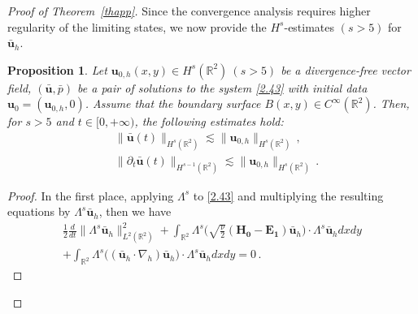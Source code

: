 \documentclass[pdflatex,sn-mathphys-num]{sn-jnl}%
\theoremstyle{thmstyleone}%
\newtheorem{proposition}[theorem]{Proposition}%
\theoremstyle{thmstyletwo}%
\theoremstyle{thmstylethree}%
\theoremstyle{thmstyletwo}
\begin{document}
\begin{proof}[Proof of Theorem~{\upshape\ref{thapp}}]
Since the convergence analysis requires higher regularity of the limiting states, we now provide the $H^s$-estimates $(s>5)$ for $\bar{\boldsymbol{u}}_h$.




\begin{proposition}\label{prop3}
	Let $ {\boldsymbol u}_{0,h}(x,y) \in{H}^{s}(\mathbb{R}^2)~(s>5)$ be a divergence-free vector field,  $(\bar{\boldsymbol u},\bar p)$ be a pair of solutions to the system \eqref{2.43} with initial data $ {\boldsymbol u}_0=( {\boldsymbol u}_{0,h},0)$.
	Assume that the boundary surface $B(x,y)\in C^\infty(\mathbb{R}^2)$.	
	Then, for $s>5$ and $t\in [0,+\infty)$, the following  estimates hold:			
	\begin{align}
		&\lVert\bar {\boldsymbol u}(t)\rVert_{H^s(\mathbb{R}^2)}
		\lesssim \lVert {\boldsymbol u}_{0,h}\rVert_{H^s(\mathbb{R}^2)}
		\,,\label{2.49}\\
		&\lVert\partial_t\bar {\boldsymbol u}(t)\rVert_{H^{s-1}(\mathbb{R}^2)}
		\lesssim \lVert
		 {\boldsymbol u}_{0,h}\rVert_{H^{s}(\mathbb{R}^2)}
		\label{2.50}\,.
	\end{align}
\end{proposition}
\begin{proof}
	In the first place, applying $\varLambda^s$ to \eqref{2.43} and multiplying the resulting equations by $\varLambda^s\bar{\boldsymbol{u}}_h$, then we have
	\begin{multline}\label{2.51}
		\frac12\frac{d}{dt}\lVert\varLambda^s\bar {\boldsymbol u}_h\rVert_{L^2(\mathbb{R}^2)}^2
		+\int_{\mathbb{R}^2}			
		\varLambda^s\big(
		\sqrt{\tfrac{\nu}{2}}
		(\boldsymbol{H_0}
		-\boldsymbol{E_1})
		\bar{\boldsymbol u}_h
		\big)
		\cdot
		\varLambda^s
		\bar {\boldsymbol u}_h
		dxdy\\
		+\int_{\mathbb{R}^2}
		\varLambda^s\big(
		(\bar {\boldsymbol u}_h \cdot \nabla_h) \bar {\boldsymbol u}_h
		\big)
		\cdot
		\varLambda^s
		\bar {\boldsymbol u}_h
		dxdy=0\,.
	\end{multline}
	
	
	

\end{proof}
\end{proof}
\end{document}
